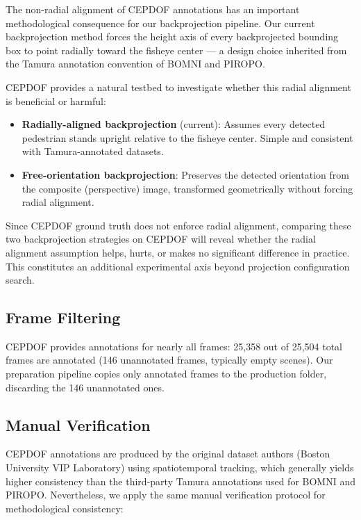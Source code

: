 \documentclass[11pt]{article}
\begin{document}
The non-radial alignment of CEPDOF annotations has an important methodological consequence for our backprojection pipeline. Our current backprojection method forces the height axis of every backprojected bounding box to point radially toward the fisheye center --- a design choice inherited from the Tamura annotation convention of BOMNI and PIROPO.

CEPDOF provides a natural testbed to investigate whether this radial alignment is beneficial or harmful:
\begin{itemize}[leftmargin=*]
    \item \textbf{Radially-aligned backprojection} (current): Assumes every detected pedestrian stands upright relative to the fisheye center. Simple and consistent with Tamura-annotated datasets.
    \item \textbf{Free-orientation backprojection}: Preserves the detected orientation from the composite (perspective) image, transformed geometrically without forcing radial alignment.
\end{itemize}

Since CEPDOF ground truth does not enforce radial alignment, comparing these two backprojection strategies on CEPDOF will reveal whether the radial alignment assumption helps, hurts, or makes no significant difference in practice. This constitutes an additional experimental axis beyond projection configuration search.

\subsection{Frame Filtering}

CEPDOF provides annotations for nearly all frames: 25,358 out of 25,504 total frames are annotated (146 unannotated frames, typically empty scenes). Our preparation pipeline copies only annotated frames to the production folder, discarding the 146 unannotated ones.

\subsection{Manual Verification}

CEPDOF annotations are produced by the original dataset authors (Boston University VIP Laboratory) using spatiotemporal tracking, which generally yields higher consistency than the third-party Tamura annotations used for BOMNI and PIROPO. Nevertheless, we apply the same manual verification protocol for methodological consistency:
\end{document}
